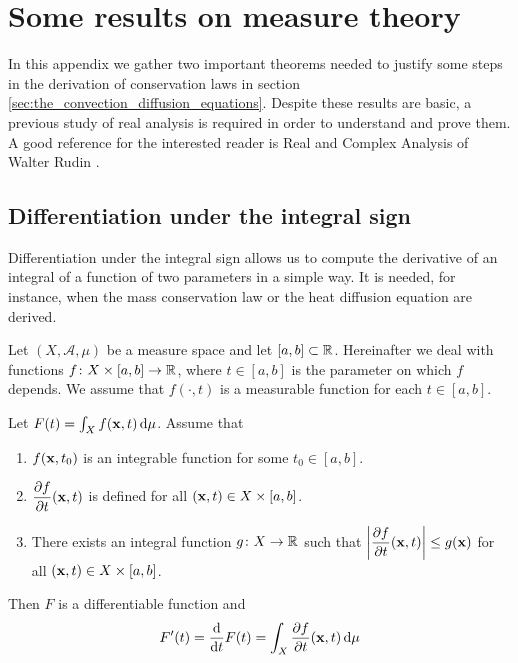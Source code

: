 
\section{Some results on measure theory}

In this appendix we gather two important theorems needed to justify some steps in the derivation of conservation laws in section \ref{sec:the_convection_diffusion_equations}. Despite these results are basic, a previous study of real analysis is required in order to understand and prove them. A good reference for the interested reader is Real and Complex Analysis of Walter Rudin \cite{rudin1987real}. 

\subsection{Differentiation under the integral sign}

Differentiation under the integral sign allows us to compute the derivative of an integral of a function of two parameters in a simple way. It is needed, for instance, when the mass conservation law or the heat diffusion equation are derived. 

Let $(X, \mathcal{A}, \mu)$ be a measure space and let $[a, b] \subset \mathbb{R}$. Hereinafter we deal with functions $f \colon X \times [a,b] \rightarrow \mathbb{R}$, where $t \in [a, b]$ is the parameter on which $f$ depends. We assume that $f(\cdot, t)$ is a measurable function for each $t \in [a, b]$.

\begin{theorem} \label{theo:differentiation_under_the_integral_sign}
	Let $F(t) = \int_X f(\vb{x},t) \dd{\mu}$. Assume that
	\begin{enumerate}[label={(\roman*)}, topsep=0pt]
		\item $f(\vb{x},t_0)$ is an integrable function for some $t_0 \in [a,b]$.
		\item $\dfrac{\partial f}{\partial t}(\vb{x},t)$ is defined for all $(\vb{x}, t) \in X \times [a, b]$.
		\item There exists an integral function $g \colon X \rightarrow \mathbb{R}$ such that $\abs{\dfrac{\partial f}{\partial t} (\vb{x},t)} \leq g(\vb{x})$ for all $(\vb{x}, t) \in X \times [a, b]$.
	\end{enumerate}
	Then $F$ is a differentiable function and
	\[
		F'(t) = \frac{\dd}{\dd t} F(t) = \int_X \frac{\partial f}{\partial t}(\vb{x},t) \dd{\mu}
	\]
\end{theorem}

